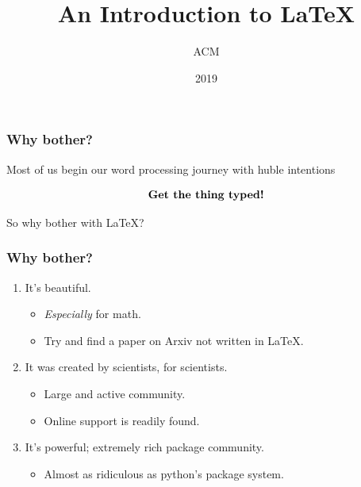 \documentclass{beamer}
\title{An Introduction to \LaTeX}
\author{ACM}
\institute{New York University}
\date{2019}
\begin{document}
 
\frame{\titlepage}
 

\begin{frame}
\frametitle{Why bother?}
Most of us begin our word processing journey with huble intentions

\[
\text{\textbf{Get the thing typed!}}
\]

So why bother with \LaTeX\@?

\end{frame}


\begin{frame}
\frametitle{Why bother?}

\begin{enumerate}

    \item It's beautiful.

        \begin{itemize}
            \item \textit{Especially} for math.
            \item Try and find a paper on Arxiv not written in \LaTeX.
        \end{itemize}

    \item It was created by scientists, for scientists.

        \begin{itemize}
            \item Large and active community.
            \item Online support is readily found.
        \end{itemize}

    \item It's powerful; extremely rich package community.
    \begin{itemize}
    \item Almost as ridiculous as python's package system.
    \end{itemize}

\end{enumerate}

\end{frame}
\end{document}
